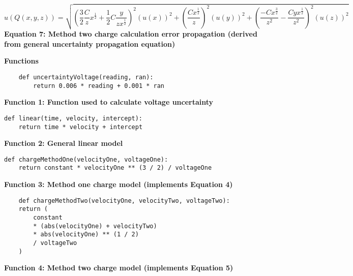 \documentclass[
	letterpaper, %
	10pt, %
]{CSUniSchoolLabReport}
\begin{document}
\begin{center}
    $$u(Q(x,y,z)) =
    \sqrt{
        \left(
            \frac{3}{2}\frac{C}{z}x^\frac12 + \frac{1}{2}C\frac{y}{zx^\frac12}
        \right)^2(u(x))^2 +
        \left(
            \frac{Cx^\frac{1}{2}}{z}
        \right)^2(u(y))^2 +
        \left(
            \frac{-Cx^\frac{3}{2}}{z^2} - \frac{Cyx^\frac12}{z^2}
        \right) ^2 (u(z))^2
    }
    $$
    \textbf{Equation 7: Method two charge calculation error propagation (derived from general uncertainty propagation equation)}
\end{center}
\newpage
{\Large\textbf{Functions}}\\
\begin{verbatim}
    def uncertaintyVoltage(reading, ran):
        return 0.006 * reading + 0.001 * ran
\end{verbatim}
\begin{center}
    \textbf{Function 1: Function used to calculate voltage uncertainty}
\end{center}

\begin{verbatim}
def linear(time, velocity, intercept):
    return time * velocity + intercept
\end{verbatim}
\begin{center}
    \textbf{Function 2: General linear model}
\end{center}

\begin{verbatim}
def chargeMethodOne(velocityOne, voltageOne):
    return constant * velocityOne ** (3 / 2) / voltageOne
\end{verbatim}
\begin{center}
    \textbf{Function 3: Method one charge model (implements Equation 4)}
\end{center}

\begin{verbatim}
    def chargeMethodTwo(velocityOne, velocityTwo, voltageTwo):
    return (
        constant
        * (abs(velocityOne) + velocityTwo)
        * abs(velocityOne) ** (1 / 2)
        / voltageTwo
    )
    \end{verbatim}
\begin{center}
    \textbf{Function 4: Method two charge model (implements Equation 5)}
\end{center}
\end{document}
